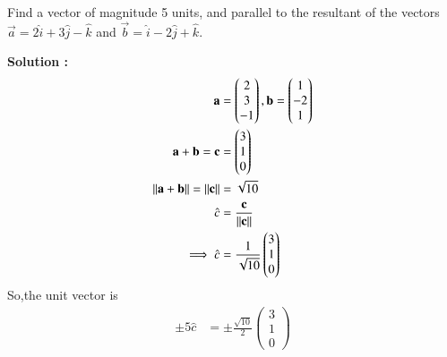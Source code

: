  Find a vector of magnitude 5 units, and parallel to the resultant of the vectors $\vec{a} = 2\hat{i}+3\hat{j}-\hat{k}$ and $\vec{b} = \hat{i}-2\hat{j}+\hat{k}$.

\textbf{Solution :}
\begin{align}
    \Vec{a}&=\begin{pmatrix}
        2\\3\\-1
    \end{pmatrix},\Vec{b}=\begin{pmatrix}
        1\\-2\\1
    \end{pmatrix}\\
	\vec{a+b=c}&=\begin{pmatrix}
        3\\1\\0
    \end{pmatrix}\\
    \norm{\vec{a+b}}=\norm{\vec{c}}&=\sqrt{10}\\
	\hat{c}&=\frac{\vec{c}}{\norm{\vec{c}}} \\
    \implies\hat{c}&=\frac{1}{\sqrt{10}}\begin{pmatrix}
        3\\1\\0
    \end{pmatrix}
\end{align}
So,the unit vector is
\begin{align}
    \pm5\hat{c}&=\pm\frac{\sqrt{10}}{2}\begin{pmatrix}
        3\\1\\0
    \end{pmatrix}
\end{align}
   
